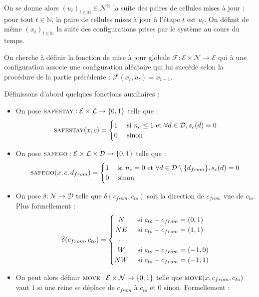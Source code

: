 \documentclass[11pt, openany]{article}
\newcommand{\N}{\mathbb{N}}
\newcommand{\La}{\mathcal{L}}
\newcommand{\Ne}{\mathcal{N}}
\newcommand{\D}{\mathcal{D}}
\newcommand{\Ss}{\textsc{safestay}}
\newcommand{\Sg}{\textsc{safego}}
\newcommand{\M}{\textsc{move}}
\newcommand{\E}{\mathcal{E}}
\begin{document}
On se donne alors $(u_t)_{t\in\N} \in \Ne^\N$ la suite des paires de cellules mises à jour : pour tout $t\in\N$, la paire de cellules mises à jour à l'étape $t$ est $u_t$. On définit de même $(x_t)_{t\in\N}$ la suite des configurations prises par le système au cours du temps.

On cherche à  définir la fonction de mise à jour globale $\mathcal{F} : {\E\times\Ne}\to\E$ qui à une configuration associe une configuration aléatoire qui lui succède selon la procédure de la partie précédente : $\mathcal{F}(x_t, u_t) = x_{t+1}$.

Définissons d'abord quelques fonctions auxiliaires :

 \begin{itemize}
  \item{On pose $\Ss : {\E\times\La}\to\{0,1\}$ telle que : \[
 \Ss(x,c) =
  \begin{cases} 
      \hfill 1    \hfill & \text{ si $n_c\leq 1$ et $\forall d \in \D, s_c(d)=0$} \\
      \hfill 0 \hfill & \text{ sinon} \\
  \end{cases}
\]}
  \item{On pose $\Sg :  {\E\times\La\times\D}\to\{0,1\}$ telle que : \[
 \Sg(x,c, d_{from}) =
  \begin{cases} 
      \hfill 1    \hfill & \text{ si $n_c=0$ et $\forall d \in \D\setminus\{d_{from}\}, s_c(d)=0$} \\
      \hfill 0 \hfill & \text{ sinon} \\
  \end{cases}
\]}
  \item{On pose $\delta :\Ne\to\D$ telle que $\delta(c_{from}, c_{to})$ soit la direction de $c_{from}$ vue de $c_{to}$. Plus formellement : \[
 \delta(c_{from}, c_{to}) =
  \begin{cases} 
      \hfill N    \hfill & \text{ si $c_{to}-c_{from}=(0,1)$} \\
      \hfill NE \hfill & \text{ si  $c_{to}-c_{from}=(1,1)$} \\
      \hfill \cdots & \\
      \hfill W \hfill & \text{ si  $c_{to}-c_{from}= (-1,0)$}\\
      \hfill NW \hfill & \text { si  $c_{to}-c_{from}=(-1,1)$}\\
  \end{cases}
\] }
  \item{On peut alors définir $\M :{\E\times\Ne}\to\{0,1\}$ telle que $\M(x,c_{from}, c_{to})$ vaut $1$ si une reine se déplace de $c_{from}$ à $c_{to}$ et $0$ sinon. Formellement : \[
\]}
\end{itemize}
\end{document}
